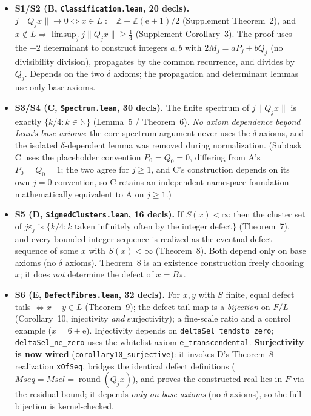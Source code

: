 \documentclass[11pt]{amsart}
\theoremstyle{definition}
\theoremstyle{remark}
\numberwithin{equation}{section}
\newcommand{\Z}{\mathbb{Z}}
\newcommand{\N}{\mathbb{N}}
\newcommand{\ee}{\mathrm{e}}
\begin{document}
\begin{itemize}
\item \textbf{S1/S2 (B, \texttt{Classification.lean}, 20 decls).} $j\|Q_j x\|\to0\iff x\in L:=\Z+\Z(\ee+1)/2$ (Supplement Theorem~2), and $x\notin L\Rightarrow\limsup_j j\|Q_j x\|\ge\tfrac14$ (Supplement Corollary~3). The proof uses the $\pm2$ determinant to construct integers $a,b$ with $2M_j=aP_j+bQ_j$ (no divisibility division), propagates by the common recurrence, and divides by $Q_j$. Depends on the two $\delta$ axioms; the propagation and determinant lemmas use only base axioms.
\item \textbf{S3/S4 (C, \texttt{Spectrum.lean}, 30 decls).} The finite spectrum of $j\|Q_j x\|$ is exactly $\{k/4:k\in\N\}$ (Lemma~5 / Theorem~6). \emph{No axiom dependence beyond Lean's base axioms}: the core spectrum argument never uses the $\delta$ axioms, and the isolated $\delta$-dependent lemma was removed during normalization. (Subtask C uses the placeholder convention $P_0=Q_0=0$, differing from A's $P_0=Q_0=1$; the two agree for $j\ge1$, and C's construction depends on its own $j=0$ convention, so C retains an independent namespace foundation mathematically equivalent to A on $j\ge1$.)
\item \textbf{S5 (D, \texttt{SignedClusters.lean}, 16 decls).} If $S(x)<\infty$ then the cluster set of $j\varepsilon_j$ is $\{k/4:k\text{ taken infinitely often by the integer defect}\}$ (Theorem~7), and every bounded integer sequence is realized as the eventual defect sequence of some $x$ with $S(x)<\infty$ (Theorem~8). Both depend only on base axioms (no $\delta$ axioms). Theorem~8 is an existence construction freely choosing $x$; it does \emph{not} determine the defect of $x=B\pi$.
\item \textbf{S6 (E, \texttt{DefectFibres.lean}, 32 decls).} For $x,y$ with $S$ finite, equal defect tails $\iff x-y\in L$ (Theorem~9); the defect-tail map is a \emph{bijection} on $F/L$ (Corollary~10, injectivity \emph{and} surjectivity); a fine-scale ratio and a control example ($x=6\pm\ee$). Injectivity depends on \texttt{deltaSel\_\allowbreak{}tendsto\_\allowbreak{}zero}; \texttt{deltaSel\_\allowbreak{}ne\_\allowbreak{}zero} uses the whitelist axiom \texttt{e\_\allowbreak{}transcendental}. \textbf{Surjectivity is now wired} (\texttt{corollary10\_\allowbreak{}surjective}): it invokes D's Theorem~8 realization \texttt{xOfSeq}, bridges the identical defect definitions ($Mseq=Msel=\operatorname{round}(Q_j x)$), and proves the constructed real lies in $F$ via the residual bound; it depends \emph{only on base axioms} (no $\delta$ axioms), so the full bijection is kernel-checked.

\end{itemize}
\end{document}
